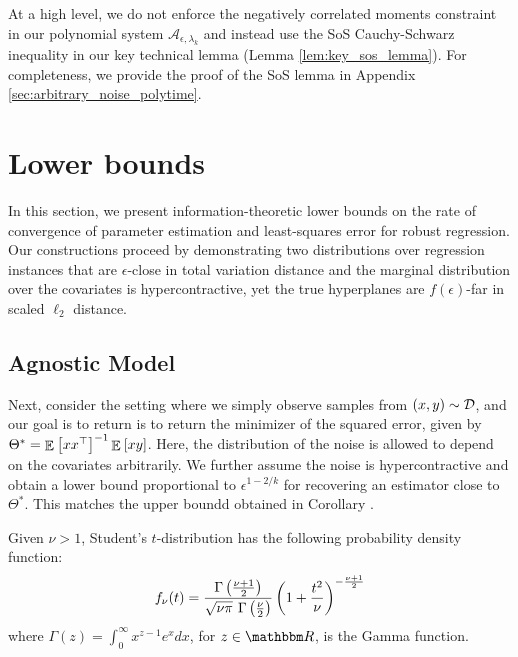 \documentclass[preprint,11pt]{elsarticle}
\begin{document}
At a high level, we do not enforce the negatively correlated moments constraint in our polynomial system $\mathcal{A}_{\epsilon, \lambda_k}$ and instead use the SoS Cauchy-Schwarz inequality in our key technical lemma (Lemma \ref{lem:key_sos_lemma}). For completeness, we provide the proof of the SoS lemma in Appendix \ref{sec:arbitrary_noise_polytime}.


\section*{Lower bounds}

In this section, we present information-theoretic lower bounds on the rate of convergence of parameter estimation and least-squares error for robust regression. Our constructions proceed by demonstrating two distributions over regression instances that are $\epsilon$-close in total variation distance and the marginal distribution over the covariates is hypercontractive, yet the true hyperplanes are $f(\epsilon)$-far in scaled $\ell_2$ distance. 


\subsection*{Agnostic Model}
Next, consider the setting where we simply observe samples from $(x,y) \sim \mathcal D$, and our goal is to return is to return the minimizer of the squared error, given by $\Theta^* = \mathop{\mathbb{E}}_{}\left[ x x^{\top} \right]^{-1}\mathop{\mathbb{E}}_{}\left[ xy \right]$. Here, the distribution of the noise is allowed to depend on the covariates arbitrarily. We further assume the noise is hypercontractive and obtain a lower bound proportional to $\epsilon^{1-2/k}$ for recovering an estimator close to $\Theta^*$. This matches the upper boundd obtained in Corollary \cite{liu2018high}. 


\begin{definition}
Given $\nu > 1$, Student's $t$-distribution has the following probability density function: 
\begin{equation*}
    f_{\nu}(t) = \frac{ \Gamma\left(\frac{\nu + 1}{2} \right) }{\sqrt{\nu \pi} \hspace{0.05in} \Gamma\left(\frac{\nu }{2} \right) } \left(1 + \frac{t^2}{\nu} \right)^{- \frac{\nu+1}{2}} 
\end{equation*}
where $\Gamma(z) = \int_{0}^\infty x^{z-1} e^x dx $, for $z\in\R$, is the Gamma function. 
\end{definition}


\printbibliography
\end{document}
